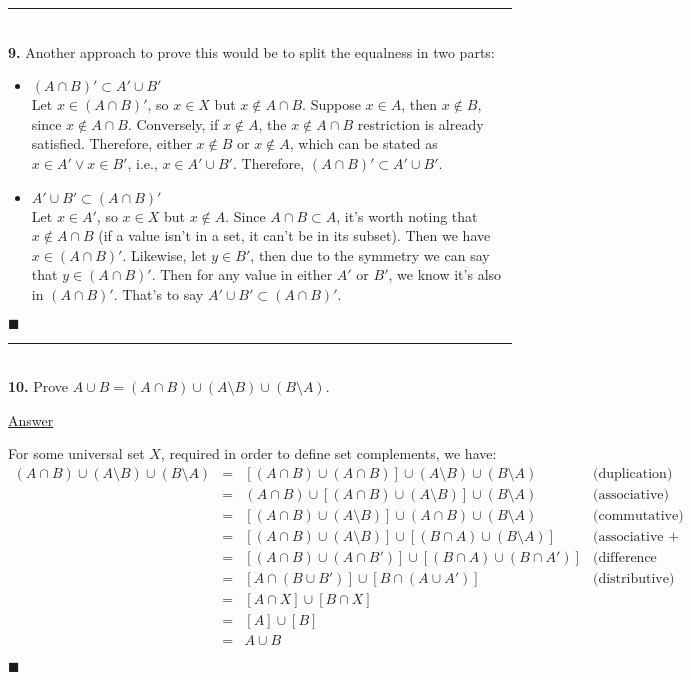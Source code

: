 \documentclass{article}[10pt]
\newenvironment{exercise}[1]
    {\noindent\rule{2cm}{0.4pt} \\
     \textbf{#1.}}
    {}
\newcommand{\answer}{

  \underline{Answer}

}
\newcommand{\qed}{

\hfill\ensuremath{\blacksquare}

}
\begin{document}
\begin{exercise}{9}
  Another approach to prove this would be to split the equalness
  in two parts:
  \begin{itemize}
    \item $(A \cap B)' \subset A' \cup B'$ \\
      Let $x \in (A \cap B)'$, so $x \in X$ but $x \notin A \cap B$.
      Suppose $x \in A$, then $x \notin B$, since $x \notin A \cap B$.
      Conversely, if $x \notin A$, the $x \notin A \cap B$
      restriction is already satisfied.
      Therefore, either $x \notin B$ or $x \notin A$,
      which can be stated as $x \in A' \lor x\in B'$,
      i.e., $x \in A' \cup B'$.
      Therefore, $(A \cap B)' \subset A' \cup B'$.
    \item $A' \cup B' \subset (A \cap B)'$ \\
      Let $x \in A'$, so $x \in X$ but $x \notin A$.
      Since $A \cap B \subset A$,
      it's worth noting that $x \notin A \cap B$
      (if a value isn't in a set, it can't be in its subset).
      Then we have $x \in (A \cap B)'$.
      Likewise, let $y \in B'$,
      then due to the symmetry we can say that $y \in (A \cap B)'$.
      Then for any value in either $A'$ or $B'$,
      we know it's also in $(A \cap B)'$.
      That's to say $A' \cup B' \subset (A \cap B)'$.
  \end{itemize}
  \qed
\end{exercise}


\begin{exercise}{10}
  Prove $A \cup B = (A \cap B) \cup (A \setminus B)
                               \cup (B \setminus A)$.
  \answer
  For some universal set $X$,
  required in order to define set complements,
  we have:
  \[\begin{array}{rclr}
    (A \cap B) \cup (A \setminus B) \cup (B \setminus A)
    &=& \left[ (A \cap B) \cup (A \cap B) \right] \cup
        (A \setminus B) \cup (B \setminus A)
      & \text{(duplication)} \\
    &=& (A \cap B) \cup \left[ (A \cap B) \cup
        (A \setminus B) \right] \cup (B \setminus A)
      & \text{(associative)} \\
    &=& \left[ (A \cap B) \cup (A \setminus B) \right] \cup
        (A \cap B) \cup (B \setminus A)
      & \text{(commutative)} \\
    &=& \left[ (A \cap B) \cup (A \setminus B) \right] \cup
        \left[ (B \cap A) \cup (B \setminus A) \right]
      & \text{(associative + commutative)} \\
    &=& \left[ (A \cap B) \cup (A \cap B') \right] \cup
        \left[ (B \cap A) \cup (B \cap A') \right]
      & \text{(difference definition)} \\
    &=& \left[ A \cap (B \cup B') \right] \cup
        \left[ B \cap (A \cup A') \right]
      & \text{(distributive)} \\
    &=& \left[ A \cap X \right] \cup
        \left[ B \cap X \right] \\
    &=& \left[ A \right] \cup \left[ B \right] \\
    &=& A \cup B
  \end{array}\]
  \qed
\end{exercise}
\end{document}
